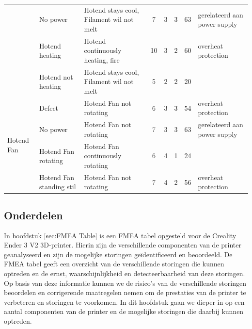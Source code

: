 \documentclass{article}
\begin{document}
\begin{landscape}
\begin{longtable}{|l|l|l|c|c|c|c|l|}
                                            & No power                  & Hotend stays cool, Filament wil not melt          & 7 & 3 & 3 & 63 & gerelateerd aan power supply\\
                                            & Hotend heating            & Hotend continuously heating, fire                 & 10 & 3 & 2 & 60 & overheat protection\\
                                            & Hotend not heating        & Hotend stays cool, Filament wil not melt          & 5 & 2 & 2 & 20 & \\ 
                                            \hline
        \multirow{4}{*}{Hotend Fan}         & Defect                    & Hotend Fan not rotating                           & 6 & 3 & 3 & 54 & overheat protection\\
                                            & No power                  & Hotend Fan not rotating                           & 7 & 3 & 3 & 63 & gerelateerd aan power supply\\
                                            & Hotend Fan rotating       & Hotend Fan continuously rotating                  & 6 & 4 & 1 & 24 & \\
                                            & Hotend Fan standing stil  & Hotend Fan not rotating                           & 7 & 4 & 2 & 56 & overheat protection\\ 
                                            \hline   
    \end{longtable}
\end{landscape}

\newpage

\subsection{Onderdelen}
In hoofdstuk \ref{sec:FMEA Table} is een FMEA tabel opgesteld voor de Creality Ender 3 V2 3D-printer. Hierin zijn de verschillende componenten van de printer geanalyseerd en zijn de mogelijke storingen geïdentificeerd en beoordeeld. De FMEA tabel geeft een overzicht van de verschillende storingen die kunnen optreden en de ernst, waarschijnlijkheid en detecteerbaarheid van deze storingen. Op basis van deze informatie kunnen we de risico's van de verschillende storingen beoordelen en corrigerende maatregelen nemen om de prestaties van de printer te verbeteren en storingen te voorkomen. In dit hoofdstuk gaan we dieper in op een aantal componenten van de printer en de mogelijke storingen die daarbij kunnen optreden.
\end{document}
